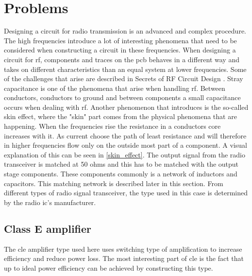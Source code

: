 \section{Problems}
Designing a circuit for radio transmission is an advanced and complex procedure. 
The high frequencies introduce a lot of interesting phenomena that need to be considered when constructing a circuit in these frequencies. 
When designing a circuit for \gls{rf}, components and traces on the \gls{pcb} behaves in a different way and takes on different characteristics than an equal system at lower frequencies. 
Some of the challenges that arise are described in Secrets of RF Circuit Design \cite{secrets_of_rf}. 
Stray capacitance is one of the phenomena that arise when handling \gls{rf}. 
Between conductors, conductors to ground and between components a small capacitance occurs when dealing with \gls{rf}.
\newline
Another phenomenon that introduces is the so-called skin effect, where the "skin" part comes from the physical phenomena that are happening. When the frequencies rise the resistance in a conductors core increases with it. As current choose the path of least resistance and will therefore in higher frequencies flow only on the outside most part of a component. A visual explanation of this can be seen in \autoref{skin_effect}.
\newline
The output signal from the radio transceiver is matched at 50 ohms and this has to be matched with the output stage components. These components commonly is a network of inductors and capacitors. This matching network is described later in this section. 
From different types of radio signal transceiver, the type used in this case is determined by the radio \gls{ic}'s manufacturer. \cite{si4460}

\subsection{Class E amplifier}
The \gls{cle} amplifier type used here uses switching type of amplification to increase efficiency and reduce power loss. 
The most interesting part of \gls{cle} is the fact that up to ideal power efficiency can be achieved by constructing this type. \cite{class_e_new}

